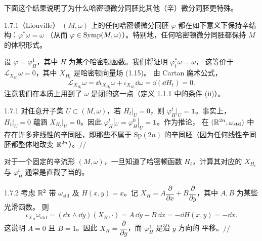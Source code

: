 下面这个结果说明了为什么哈密顿微分同胚比其他（辛）微分同胚更特殊。

\begin{wprop}{1.7.1}（Liouville）
$(M,\omega)$ 上的任何哈密顿微分同胚 $\varphi$ 都在如下意义下保持辛结构：$\varphi^*\omega=\omega$
（从而 $\varphi\in\operatorname{Symp}(M,\omega)$）。特别地，任何哈密顿微分同胚都保持 $M$ 的体积形式。
\end{wprop}

\begin{wproof}
设 $\varphi=\varphi_H^1$，其中 $H$ 为某个哈密顿函数。我们将证明 $\varphi_t^*\omega=\omega$，
这等价于 $\mathcal{L}_{X_{H_t}}\omega=0$，其中 $X_{H_t}$ 是哈密顿向量场 (1.15)。
由 Cartan 魔术公式，
\[
  \mathcal{L}_{X_{H_t}}\omega
  =\dd\iota_{X_{H_t}}\omega+\iota_{X_{H_t}}\dd\omega
  =\dd(\dd H_t)=0 .
\]
注意我们在本质上用到了 $\omega$ 是闭的这一点（定义 1.1.1 中的条件 (ii)）。
\end{wproof}

\begin{wexam}{1.7.1}
对任意开子集 $U\subset(M,\omega)$，若 $H_t|_U=0$，则 $\varphi_H^t|_U=\mathbf{1}$。事实上，
$H_t|_U=0$ 蕴涵 $X_{H_t}|_U=0$。因此 $\varphi_H^t|_U=\varphi_H^0|_U=\mathbf{1}$。作为推论，
在 $(\mathbb{R}^{2n},\omega_{\mathrm{std}})$ 中存在许多非线性的辛同胚，即那些不属于
$\mathrm{Sp}(2n)$ 的辛同胚（因为任何线性辛同胚都整体地改变 $\mathbb{R}^{2n}$）。\hfill$//$
\end{wexam}

对于一个固定的辛流形 $(M,\omega)$，一旦知道了哈密顿函数 $H_t$，计算其对应的 $X_{H_t}$ 与
$\varphi_H^t$ 通常是直截了当的。

\begin{wexam}{1.7.2}
考虑 $\mathbb{R}^2$ 带 $\omega_{\mathrm{std}}$ 及 $H(x,y)=x$。记
$X_H=A\dfrac{\partial}{\partial x}+B\dfrac{\partial}{\partial y}$，其中 $A,B$ 为某些光滑函数。
则
\[
  \iota_{X_H}\omega_{\mathrm{std}}
  =(\dd x\wedge\dd y)(X_H,\cdot)
  =A\,\dd y-B\,\dd x
  =-\dd H(x,y)=-\dd x .
\]
这说明 $A=0$ 且 $B=1$。因此 $X_H=\dfrac{\partial}{\partial y}$，而 $\varphi_H^1$ 是沿 $y$ 方向的
平移。\hfill$//$
\end{wexam}

